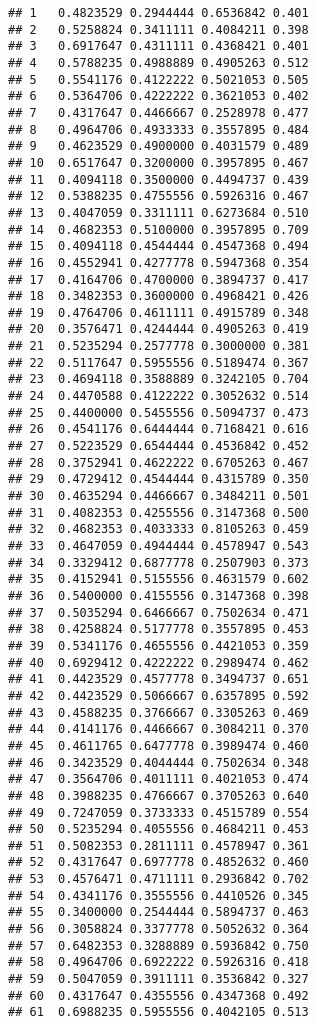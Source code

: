 \documentclass[
]{article}
\begin{document}
\begin{verbatim}
## 1   0.4823529 0.2944444 0.6536842 0.401
## 2   0.5258824 0.3411111 0.4084211 0.398
## 3   0.6917647 0.4311111 0.4368421 0.401
## 4   0.5788235 0.4988889 0.4905263 0.512
## 5   0.5541176 0.4122222 0.5021053 0.505
## 6   0.5364706 0.4222222 0.3621053 0.402
## 7   0.4317647 0.4466667 0.2528978 0.477
## 8   0.4964706 0.4933333 0.3557895 0.484
## 9   0.4623529 0.4900000 0.4031579 0.489
## 10  0.6517647 0.3200000 0.3957895 0.467
## 11  0.4094118 0.3500000 0.4494737 0.439
## 12  0.5388235 0.4755556 0.5926316 0.467
## 13  0.4047059 0.3311111 0.6273684 0.510
## 14  0.4682353 0.5100000 0.3957895 0.709
## 15  0.4094118 0.4544444 0.4547368 0.494
## 16  0.4552941 0.4277778 0.5947368 0.354
## 17  0.4164706 0.4700000 0.3894737 0.417
## 18  0.3482353 0.3600000 0.4968421 0.426
## 19  0.4764706 0.4611111 0.4915789 0.348
## 20  0.3576471 0.4244444 0.4905263 0.419
## 21  0.5235294 0.2577778 0.3000000 0.381
## 22  0.5117647 0.5955556 0.5189474 0.367
## 23  0.4694118 0.3588889 0.3242105 0.704
## 24  0.4470588 0.4122222 0.3052632 0.514
## 25  0.4400000 0.5455556 0.5094737 0.473
## 26  0.4541176 0.6444444 0.7168421 0.616
## 27  0.5223529 0.6544444 0.4536842 0.452
## 28  0.3752941 0.4622222 0.6705263 0.467
## 29  0.4729412 0.4544444 0.4315789 0.350
## 30  0.4635294 0.4466667 0.3484211 0.501
## 31  0.4082353 0.4255556 0.3147368 0.500
## 32  0.4682353 0.4033333 0.8105263 0.459
## 33  0.4647059 0.4944444 0.4578947 0.543
## 34  0.3329412 0.6877778 0.2507903 0.373
## 35  0.4152941 0.5155556 0.4631579 0.602
## 36  0.5400000 0.4155556 0.3147368 0.398
## 37  0.5035294 0.6466667 0.7502634 0.471
## 38  0.4258824 0.5177778 0.3557895 0.453
## 39  0.5341176 0.4655556 0.4421053 0.359
## 40  0.6929412 0.4222222 0.2989474 0.462
## 41  0.4423529 0.4577778 0.3494737 0.651
## 42  0.4423529 0.5066667 0.6357895 0.592
## 43  0.4588235 0.3766667 0.3305263 0.469
## 44  0.4141176 0.4466667 0.3084211 0.370
## 45  0.4611765 0.6477778 0.3989474 0.460
## 46  0.3423529 0.4044444 0.7502634 0.348
## 47  0.3564706 0.4011111 0.4021053 0.474
## 48  0.3988235 0.4766667 0.3705263 0.640
## 49  0.7247059 0.3733333 0.4515789 0.554
## 50  0.5235294 0.4055556 0.4684211 0.453
## 51  0.5082353 0.2811111 0.4578947 0.361
## 52  0.4317647 0.6977778 0.4852632 0.460
## 53  0.4576471 0.4711111 0.2936842 0.702
## 54  0.4341176 0.3555556 0.4410526 0.345
## 55  0.3400000 0.2544444 0.5894737 0.463
## 56  0.3058824 0.3377778 0.5052632 0.364
## 57  0.6482353 0.3288889 0.5936842 0.750
## 58  0.4964706 0.6922222 0.5926316 0.418
## 59  0.5047059 0.3911111 0.3536842 0.327
## 60  0.4317647 0.4355556 0.4347368 0.492
## 61  0.6988235 0.5955556 0.4042105 0.513

\end{verbatim}
\end{document}
